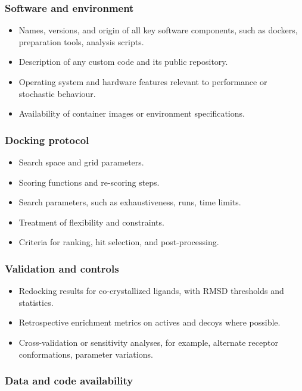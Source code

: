 \documentclass[12pt]{article}
\begin{document}
\subsubsection*{Software and environment}

\begin{itemize}
  \item Names, versions, and origin of all key software components, such as dockers, preparation tools, analysis scripts.
  \item Description of any custom code and its public repository.
  \item Operating system and hardware features relevant to performance or stochastic behaviour.
  \item Availability of container images or environment specifications.
\end{itemize}

\subsubsection*{Docking protocol}

\begin{itemize}
  \item Search space and grid parameters.
  \item Scoring functions and re-scoring steps.
  \item Search parameters, such as exhaustiveness, runs, time limits.
  \item Treatment of flexibility and constraints.
  \item Criteria for ranking, hit selection, and post-processing.
\end{itemize}

\subsubsection*{Validation and controls}

\begin{itemize}
  \item Redocking results for co-crystallized ligands, with RMSD thresholds and statistics.
  \item Retrospective enrichment metrics on actives and decoys where possible.
  \item Cross-validation or sensitivity analyses, for example, alternate receptor conformations, parameter variations.
\end{itemize}

\subsubsection*{Data and code availability}
\end{document}
